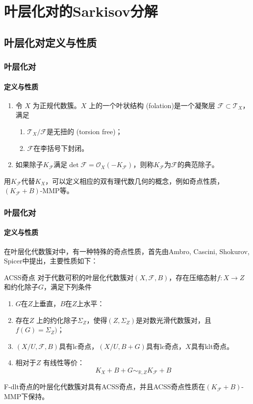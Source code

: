 \documentclass[10pt]{ctexbeamer}
\begin{document}
\section{叶层化对的Sarkisov分解}

\subsection{叶层化对定义与性质}
\begin{frame}[shrink]
  \frametitle{叶层化对}
  \framesubtitle{定义与性质}
\begin{definition}[叶状结构]\citeauthor[Definition 2.3-6]{acc_foliation}
  \begin{enumerate}
    \item 令 $X$ 为正规代数簇。$X$ 上的一个叶状结构 (folation)是一个凝聚层 $\mathcal{F} \subset \mathcal{T}_{X}$，满足
          \begin{enumerate}
            \item $\mathcal{T}_{X}/\mathcal{F}$是无扭的 (torsion free)；
            \item $\mathcal{F}$在李括号下封闭。 
          \end{enumerate}
    \item 如果除子$K_{\mathcal{F}}$满足$\det \mathcal{F} = \mathcal{O}_{X}(-K_{\mathcal{F}})$，则称$K_{\mathcal{F}}$为$\mathcal{F}$的典范除子。
  \end{enumerate}
\end{definition}
用$K_{\mathcal{F}}$代替$K_{X}$，可以定义相应的双有理代数几何的概念，例如奇点性质，$(K_{\mathcal{F}}+B)$-MMP等。
\end{frame}

\begin{frame}[shrink]
  \frametitle{叶层化对}
  \framesubtitle{定义与性质}
在叶层化代数簇对中，有一种特殊的奇点性质，首先由Ambro, Cascini, Shokurov, Spicer\cite{acss}中提出，主要性质如下：
\begin{block}{ACSS奇点}
 对于代数可积的叶层化代数簇对$(X,\mathcal{F},B)$，存在压缩态射$f:X \to Z$和约化除子$G$，满足下列条件
  \begin{enumerate}
    \item $G$在$Z$上垂直，$B$在$Z$上水平： 
    \item 存在$Z$ 上的约化除子$\Sigma_{Z}$，使得$(Z,\Sigma_{Z}) $是对数光滑代数簇对，且$f(G)=\Sigma_{Z})$；
    \item $(X/U,\mathcal{F},B)$具有lc奇点，$(X/U,B+G)$具有lc奇点，$X $具有klt奇点。
    \item 相对于$Z$ 有线性等价：
      \[ K_{X}+B+G\sim_{\mathbb{R},Z}K_{\mathcal{F}}+B \]
    \end{enumerate}
\end{block}
F-dlt奇点的叶层化代数簇对具有ACSS奇点，并且ACSS奇点性质在$(K_{\mathcal{F}}+B)$-MMP下保持。 
\end{frame}
\end{document}
